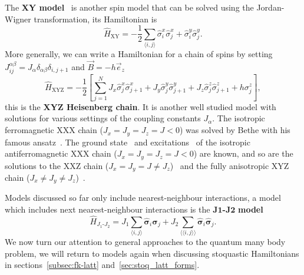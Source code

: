The \textbf{XY model}~\cite{lieb1961two} is another spin model that can be solved using the Jordan-Wigner transformation, its Hamiltonian is
\begin{equation}
	\label{eq:h-xy}
\hat H_{\text{XY}}=-\frac{1}{2} \sum_{\langle i, j\rangle} \hat\sigma_{i}^{x} \hat\sigma_{j}^{x}+\hat\sigma_{i}^{y} \hat\sigma_{j}^{y}.
\end{equation}
More generally, we can write a Hamiltonian for a chain of spins by setting $J_{i j}^{\alpha \beta} = J_\alpha \delta_{\alpha \beta} \delta_{i, j+1}$ and $\vec{B} = -h \vec{e}_z$
\begin{equation}
	\label{eq:h-xyz}
	\hat H_{\text{XYZ}}= -\frac{1}{2}\left[ \sum_{j=1}^{N}J_{x} \hat \sigma_{j}^{x} \hat \sigma_{j+1}^{x}+J_{y} \hat \sigma_{j}^{y} \hat \sigma_{j+1}^{y}+J_{z} \hat \sigma_{j}^{z} \hat \sigma_{j+1}^{z} + h \sigma_{j}^{z}
	\right],
\end{equation}
this is the \textbf{XYZ Heisenberg chain}. It is another well studied model with solutions for various settings of the coupling constants $J_\alpha$. The isotropic ferromagnetic XXX chain ($J_x = J_y = J_z = J < 0$) was solved by Bethe with his famous ansatz~\cite{bethe1931theorie}. The ground state~\cite{hulthen1938austauschproblem} and excitations~\cite{des1962spin} of the isotropic antiferromagnetic XXX chain ($J_x = J_y = J_z = J < 0$) are known, and so are the solutions to the XXZ chain ($J_x = J_y = J \neq J_z$)~\cite{yang1966three, yang1966one, yang1966two} and the fully anisotropic XYZ chain ($J_x \neq J_y \neq J_z$)~\cite{baxter1972one}. 

Models discussed so far only include nearest-neighbour interactions, a model which includes next nearest-neighbour interactions is the $\mathbf{J1}$\textbf{-}$\mathbf{J2}$ \textbf{model}
\begin{equation}
	\label{eq:h-j1j2}
	\hat H_{J_1\text{-}J_2} = J_1 \sum_{\langle i, j \rangle} \mathbf{\hat \sigma}_i \mathbf{\hat \sigma}_j + J_2 \sum_{\langle\langle i, j \rangle\rangle} \mathbf{\hat \sigma}_i \mathbf{\hat \sigma}_j.
\end{equation}
We now turn our attention to general approaches to the quantum many body problem, we will return to models again when discussing stoquastic Hamiltonians in sections~\ref{subsec:fk-latt} and~\ref{sec:stoq_latt_forms}.


